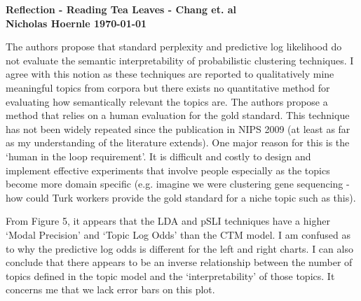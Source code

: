\documentclass[twoside]{article}
\begin{document}
\textbf{Reflection - Reading Tea Leaves - Chang et. al}\\
\textbf{Nicholas Hoernle \hfill \today}

The authors propose that standard perplexity and predictive log likelihood do not evaluate the semantic interpretability of probabilistic clustering techniques. I agree with this notion as these techniques are reported to qualitatively mine meaningful topics from corpora but there exists no quantitative method for evaluating how semantically relevant the topics are. The authors propose a method that relies on a human evaluation for the gold standard. This technique has not been widely repeated since the publication in NIPS 2009 (at least as far as my understanding of the literature extends). One major reason for this is the `human in the loop requirement'. It is difficult and costly to design and implement effective experiments that involve people especially as the topics become more domain specific (e.g. imagine we were clustering gene sequencing - how could Turk workers provide the gold standard for a niche topic such as this).

From Figure 5, it appears that the LDA and pSLI techniques have a higher `Modal Precision' and `Topic Log Odds' than the CTM model. I am confused as to why the predictive log odds is different for the left and right charts. I can also conclude that there appears to be an inverse relationship between the number of topics defined in the topic model and the `interpretability' of those topics. It concerns me that we lack error bars on this plot.
\end{document}
